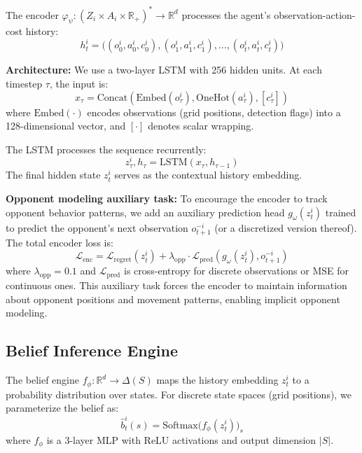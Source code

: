 \documentclass{article}
\begin{document}
The encoder $\varphi_\psi: (Z_i \times A_i \times \mathbb{R}_+)^* \to \mathbb{R}^d$ processes the agent's observation-action-cost history:
\begin{equation}
h_t^i = \big((o_0^i, a_0^i, c_0^i), (o_1^i, a_1^i, c_1^i), \ldots, (o_t^i, a_t^i, c_t^i)\big)
\end{equation}

\textbf{Architecture:} We use a two-layer LSTM with 256 hidden units. At each timestep $\tau$, the input is:
\begin{equation}
x_\tau = \text{Concat}(\text{Embed}(o_\tau^i), \text{OneHot}(a_\tau^i), [c_\tau^i])
\end{equation}
where $\text{Embed}(\cdot)$ encodes observations (grid positions, detection flags) into a 128-dimensional vector, and $[\cdot]$ denotes scalar wrapping.

The LSTM processes the sequence recurrently:
\begin{equation}
z_\tau^i, h_\tau = \text{LSTM}(x_\tau, h_{\tau-1})
\end{equation}
The final hidden state $z_t^i$ serves as the contextual history embedding.

\textbf{Opponent modeling auxiliary task:} To encourage the encoder to track opponent behavior patterns, we add an auxiliary prediction head $g_\omega(z_t^i)$ trained to predict the opponent's next observation $o_{t+1}^{-i}$ (or a discretized version thereof). The total encoder loss is:
\begin{equation}
\mathcal{L}_{\text{enc}} = \mathcal{L}_{\text{regret}}(z_t^i) + \lambda_{\text{opp}} \cdot \mathcal{L}_{\text{pred}}(g_\omega(z_t^i), o_{t+1}^{-i})
\end{equation}
where $\lambda_{\text{opp}} = 0.1$ and $\mathcal{L}_{\text{pred}}$ is cross-entropy for discrete observations or MSE for continuous ones. This auxiliary task forces the encoder to maintain information about opponent positions and movement patterns, enabling implicit opponent modeling.

\subsection{Belief Inference Engine}

The belief engine $f_\phi: \mathbb{R}^d \to \Delta(S)$ maps the history embedding $z_t^i$ to a probability distribution over states. For discrete state spaces (grid positions), we parameterize the belief as:
\begin{equation}
\hat{b}_t^i(s) = \text{Softmax}\big(f_\phi(z_t^i)\big)_s
\end{equation}
where $f_\phi$ is a 3-layer MLP with ReLU activations and output dimension $|S|$.
\end{document}
